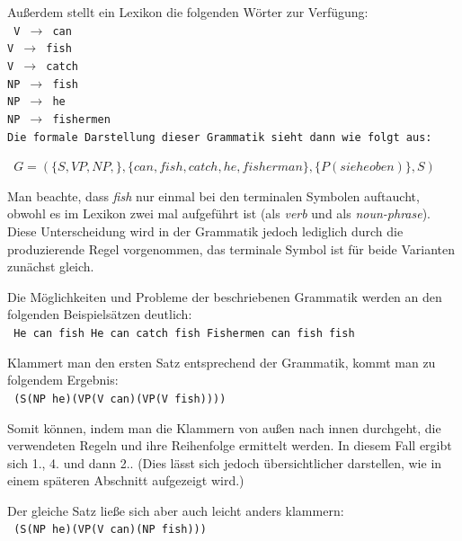 \documentclass[12pt]{report}
\begin{document}
\rm

Außerdem stellt ein Lexikon die folgenden Wörter zur Verfügung:
\newline
\\
\tt
V $\rightarrow$ can\\
V $\rightarrow$ fish\\
V $\rightarrow$ catch\\
NP $\rightarrow$ fish\\
NP $\rightarrow$ he\\
NP $\rightarrow$ fishermen\\
\rm 
\newline
Die formale Darstellung dieser Grammatik sieht dann wie folgt aus:

\begin{center}
\tt
$G=(\lbrace S,VP,NP,\rbrace ,\lbrace can, fish, catch, he, fisherman\rbrace ,\lbrace P(siehe oben)\rbrace ,S)$
\rm
\end{center}

Man beachte, dass \textit{\glqq  fish\grqq{}} nur einmal bei den terminalen Symbolen auftaucht, obwohl es im Lexikon zwei mal aufgeführt ist (als \textit{verb} und als \textit{noun-phrase}). Diese Unterscheidung wird in der Grammatik jedoch lediglich durch die produzierende Regel vorgenommen, das terminale Symbol ist für beide Varianten zunächst gleich.

Die Möglichkeiten und Probleme der beschriebenen Grammatik werden an den folgenden Beispielsätzen deutlich:
\\

\tt
\glqq  He can fish\grqq{}
\glqq  He can catch fish\grqq{}
\glqq  Fishermen can fish fish\grqq{}
\rm

Klammert man den ersten Satz entsprechend der Grammatik, kommt man zu folgendem Ergebnis:\\

\tt 
(S(NP he)(VP(V can)(VP(V fish))))\\
\rm

Somit können, indem man die Klammern von außen nach innen durchgeht, die verwendeten Regeln und ihre Reihenfolge ermittelt werden. In diesem Fall ergibt sich 1., 4. und dann 2.. (Dies lässt sich jedoch übersichtlicher darstellen, wie in einem späteren Abschnitt aufgezeigt wird.)

Der gleiche Satz ließe sich aber auch leicht anders klammern:\\

\tt
(S(NP he)(VP(V can)(NP fish)))\\
\rm
\end{document}

